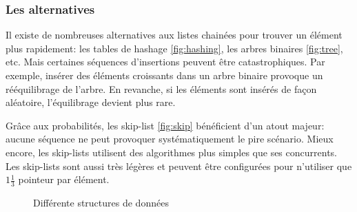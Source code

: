\documentclass[hidelinks,a4paper, 12pt]{article}
\begin{document}
	
	\subsubsection*{Les alternatives}
	Il existe de nombreuses alternatives aux listes chainées pour trouver un élément plus rapidement: les tables de hashage \ref{fig:hashing}, les arbres binaires \ref{fig:tree}, etc. Mais certaines séquences d'insertions peuvent être catastrophiques. Par exemple, insérer des éléments croissants dans un arbre binaire provoque un rééquilibrage de l'arbre. En revanche, si les éléments sont insérés de façon aléatoire, l'équilibrage devient plus rare.

	Grâce aux probabilités, les \og skip-list \fg{} \ref{fig:skip} bénéficient d'un atout majeur: aucune séquence ne peut provoquer systématiquement le pire scénario. Mieux encore, les skip-lists utilisent des algorithmes plus simples que ses concurrents. Les skip-lists sont aussi très légères et peuvent être configurées pour n'utiliser que $1\frac{1}{3}$ pointeur par élément.
	
	\begin{figure}
		\centering
		\hspace{5pt}
		\hspace{5pt}
		\caption{Différente structures de données}
	\end{figure}
\end{document}
